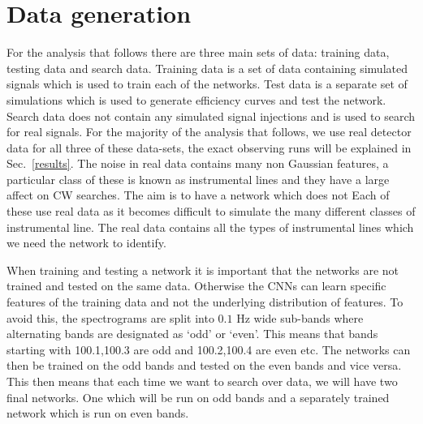\section{\label{data} Data generation}

%

For the analysis that follows there are three main sets of data: training data,
testing data and search data. 
Training data is a set of data containing simulated signals which is used to train each of
the networks.
Test data is a separate set of simulations which is used to generate
efficiency curves and test the network.
Search data does not contain any simulated signal injections and is used to search for real signals.
For the majority of the analysis that follows, we use real detector data for all three of these data-sets, the exact observing runs will be explained in Sec.~\ref{results}. 
The noise in real data contains many non Gaussian features, a particular class of these is known as instrumental lines and they have a large affect on \ac{CW} searches. 
The aim is to have a network which does not 
Each of these use
real data as it becomes difficult to simulate the many different classes of
instrumental line. The real data contains all the types of instrumental lines
which we need the network to identify.~ 

%
When training and testing a network it is important that the networks are not
trained and tested on the same data. Otherwise the \acp{CNN} can learn specific
features of the training data and not the underlying
distribution of features. To avoid this, the spectrograms are split into $0.1$
Hz wide sub-bands where alternating bands are designated as `odd' or `even'.
This means that bands starting with 100.1,100.3 are odd and 100.2,100.4 are
even etc. The networks can then be trained on the odd bands and tested on the
even bands and vice versa.
This then means that each time we want to search over data, we will have two final networks. One which will be run on odd bands and a separately trained network which is run on even bands. 

